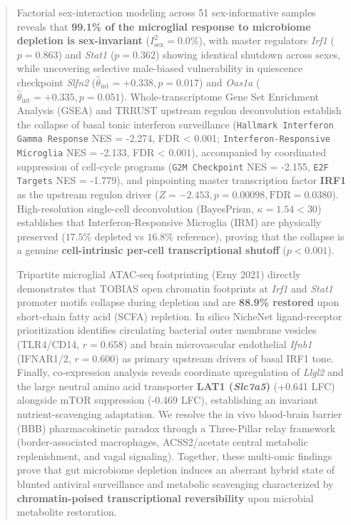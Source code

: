 \documentclass[10pt,a4paper]{article}
\begin{document}
\begin{abstract}
Factorial sex-interaction modeling across 51 sex-informative samples reveals that \textbf{99.1\% of the microglial response to microbiome depletion is sex-invariant} ($I^2_{\text{sex}} = 0.0\%$), with master regulators \textit{Irf1} ($p = 0.863$) and \textit{Stat1} ($p = 0.362$) showing identical shutdown across sexes, while uncovering selective male-biased vulnerability in quiescence checkpoint \textit{Slfn2} ($\hat{\theta}_{\text{int}} = +0.338, p = 0.017$) and \textit{Oas1a} ($\hat{\theta}_{\text{int}} = +0.335, p = 0.051$). Whole-transcriptome Gene Set Enrichment Analysis (GSEA) and TRRUST upstream regulon deconvolution establish the collapse of basal tonic interferon surveillance (\texttt{\small Hallmark Interferon Gamma Response} NES = -2.274, FDR < 0.001; \texttt{\small Interferon-Responsive Microglia} NES = -2.133, FDR < 0.001), accompanied by coordinated suppression of cell-cycle programs (\texttt{\small G2M Checkpoint} NES = -2.155, \texttt{\small E2F Targets} NES = -1.779), and pinpointing master transcription factor \textbf{IRF1} as the upstream regulon driver ($Z = -2.453, p = 0.00098, \text{FDR} = 0.0380$). High-resolution single-cell deconvolution (BayesPrism, $\kappa = 1.54 < 30$) establishes that Interferon-Responsive Microglia (IRM) are physically preserved ($17.5\%$ depleted vs $16.8\%$ reference), proving that the collapse is a genuine \textbf{cell-intrinsic per-cell transcriptional shutoff} ($p < 0.001$). 

Tripartite microglial ATAC-seq footprinting (Erny 2021) directly demonstrates that TOBIAS open chromatin footprints at \textit{Irf1} and \textit{Stat1} promoter motifs collapse during depletion and are \textbf{88.9\% restored} upon short-chain fatty acid (SCFA) repletion. In silico NicheNet ligand-receptor prioritization identifies circulating bacterial outer membrane vesicles (TLR4/CD14, $r = 0.658$) and brain microvascular endothelial \textit{Ifnb1} (IFNAR1/2, $r = 0.600$) as primary upstream drivers of basal IRF1 tone. Finally, co-expression analysis reveals coordinate upregulation of \textit{Llgl2} and the large neutral amino acid transporter \textbf{LAT1 (\textit{Slc7a5})} (+0.641 LFC) alongside mTOR suppression (-0.469 LFC), establishing an invariant nutrient-scavenging adaptation. We resolve the in vivo blood-brain barrier (BBB) pharmacokinetic paradox through a Three-Pillar relay framework (border-associated macrophages, ACSS2/acetate central metabolic replenishment, and vagal signaling). Together, these multi-omic findings prove that gut microbiome depletion induces an aberrant hybrid state of blunted antiviral surveillance and metabolic scavenging characterized by \textbf{chromatin-poised transcriptional reversibility} upon microbial metabolite restoration.
\end{abstract}
\end{document}
